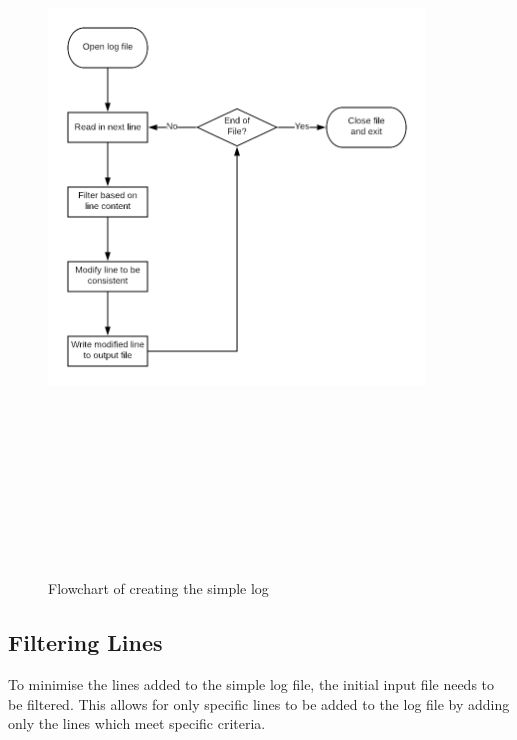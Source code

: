 \begin{figure}[h!]
    \begin{centering}
        \includegraphics[width=10cm,height=20cm,keepaspectratio]{Figures/Chapter5-SimpleLogFlowchart.png}
        \caption{Flowchart of creating the simple log}
        \label{fig:chapter5SimpleFlowchart}
    \end{centering}
\end{figure}

\pagebreak
\subsection{Filtering Lines}\label{filteringLines}
To minimise the lines added to the simple log file, the initial input file needs to be filtered.
This allows for only specific lines to be added to the log file by adding only the lines which meet specific criteria. 


